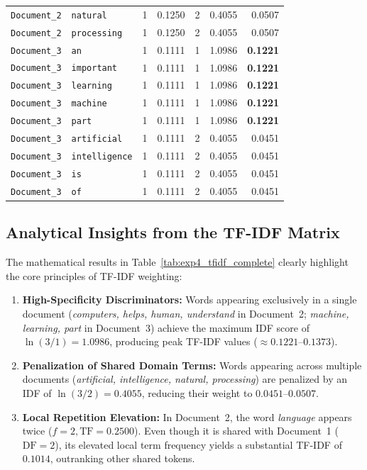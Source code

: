 \begin{table}[H]
\begin{tabularx}{\textwidth}{lllrrrr}
\texttt{Document\_2} & \texttt{natural} & 1 & 0.1250 & 2 & 0.4055 & 0.0507 \\
\texttt{Document\_2} & \texttt{processing} & 1 & 0.1250 & 2 & 0.4055 & 0.0507 \\
\midrule
\texttt{Document\_3} & \texttt{an} & 1 & 0.1111 & 1 & 1.0986 & \textbf{0.1221} \\
\texttt{Document\_3} & \texttt{important} & 1 & 0.1111 & 1 & 1.0986 & \textbf{0.1221} \\
\texttt{Document\_3} & \texttt{learning} & 1 & 0.1111 & 1 & 1.0986 & \textbf{0.1221} \\
\texttt{Document\_3} & \texttt{machine} & 1 & 0.1111 & 1 & 1.0986 & \textbf{0.1221} \\
\texttt{Document\_3} & \texttt{part} & 1 & 0.1111 & 1 & 1.0986 & \textbf{0.1221} \\
\texttt{Document\_3} & \texttt{artificial} & 1 & 0.1111 & 2 & 0.4055 & 0.0451 \\
\texttt{Document\_3} & \texttt{intelligence} & 1 & 0.1111 & 2 & 0.4055 & 0.0451 \\
\texttt{Document\_3} & \texttt{is} & 1 & 0.1111 & 2 & 0.4055 & 0.0451 \\
\texttt{Document\_3} & \texttt{of} & 1 & 0.1111 & 2 & 0.4055 & 0.0451 \\
\bottomrule
\end{tabularx}
\end{table}

\subsection{Analytical Insights from the TF-IDF Matrix}
The mathematical results in Table~\ref{tab:exp4_tfidf_complete} clearly highlight the core principles of TF-IDF weighting:
\begin{enumerate}
    \item \textbf{High-Specificity Discriminators:} Words appearing exclusively in a single document (\textit{computers, helps, human, understand} in Document~2; \textit{machine, learning, part} in Document~3) achieve the maximum IDF score of $\ln(3/1) = 1.0986$, producing peak TF-IDF values ($\approx 0.1221$--$0.1373$).
    \item \textbf{Penalization of Shared Domain Terms:} Words appearing across multiple documents (\textit{artificial, intelligence, natural, processing}) are penalized by an IDF of $\ln(3/2) = 0.4055$, reducing their weight to $0.0451$--$0.0507$.
    \item \textbf{Local Repetition Elevation:} In Document~2, the word \textit{language} appears twice ($f=2, \text{TF}=0.2500$). Even though it is shared with Document~1 ($\text{DF}=2$), its elevated local term frequency yields a substantial TF-IDF of $0.1014$, outranking other shared tokens.
\end{enumerate}

